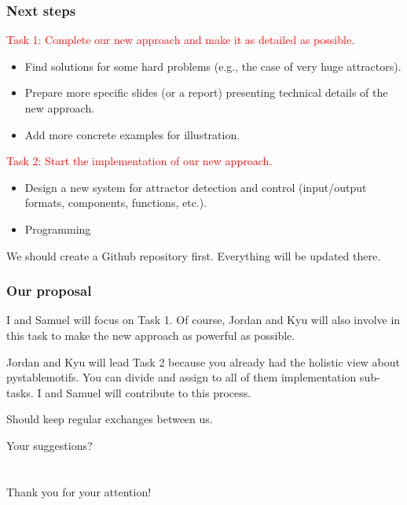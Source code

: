 \documentclass{beamer}              %
\newcommand{\red}[1]{\textcolor{red}{#1}}
\begin{document}
\begin{frame}
\frametitle{Next steps}

\red{Task 1: Complete our new approach and make it as detailed as possible.}
\begin{itemize}
  \item Find solutions for some hard problems (e.g., the case of very huge attractors).
  \item Prepare more specific slides (or a report) presenting technical details of the new approach.
  \item Add more concrete examples for illustration.
\end{itemize}

\hspace{0.8cm}

\red{Task 2: Start the implementation of our new approach.}
\begin{itemize}
  \item Design a new system for attractor detection and control (input/output formats, components, functions, etc.).
  \item Programming
\end{itemize}

\hspace{0.8cm}

We should create a Github repository first.
Everything will be updated there.
\end{frame}

\begin{frame}
\frametitle{Our proposal}

I and Samuel will focus on Task 1.
Of course, Jordan and Kyu will also involve in this task to make the new approach as powerful as possible.

\hspace{0.8cm}

Jordan and Kyu will lead Task 2 because you already had the holistic view about pystablemotifs.
You can divide and assign to all of them implementation sub-tasks.
I and Samuel will contribute to this process.

\hspace{0.8cm}

Should keep regular exchanges between us.

\hspace{0.8cm}

Your suggestions?

\end{frame}

\section*{}
\begin{frame}
  \begin{center}
	  \Large{Thank you for your attention!}
	\end{center}
\end{frame}
\end{document}
